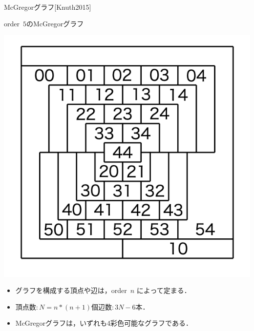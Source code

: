 \documentclass[dvipdfmx,11pt]{beamer}
\begin{document}
\begin{frame}{McGregorグラフ[Knuth2015]}
 \begin{exampleblock}{order~$5$のMcGregorグラフ}
  \begin{center}
   \includegraphics[scale=0.2]{fig/order5.png}
  \end{center}
 \end{exampleblock}

 \begin{itemize}
  \item グラフを構成する頂点や辺は，order~$n$ によって定まる．
  \item 頂点数:\,$N=n*(n+1)$個\quad 辺数:\,$3N-6$本．

  \item McGregorグラフは，いずれも4彩色可能なグラフである．
 \end{itemize}
 
\end{frame}
\end{document}

